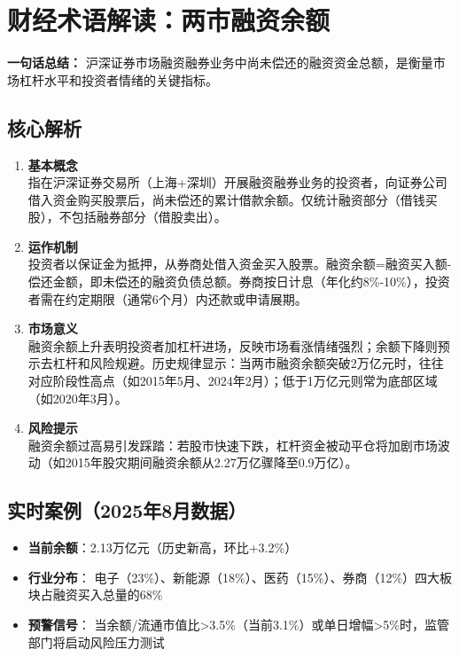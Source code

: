 \section{财经术语解读：两市融资余额}
\textbf{一句话总结：}  
沪深证券市场融资融券业务中尚未偿还的融资资金总额，是衡量市场杠杆水平和投资者情绪的关键指标。

\subsection{核心解析}
\begin{enumerate}[leftmargin=*, nosep]
    \item \textbf{基本概念}  \\
    指在沪深证券交易所（上海+深圳）开展融资融券业务的投资者，向证券公司借入资金购买股票后，尚未偿还的累计借款余额。仅统计融资部分（借钱买股），不包括融券部分（借股卖出）。
    
    \item \textbf{运作机制}  \\
    投资者以保证金为抵押，从券商处借入资金买入股票。{\color{red}融资余额=融资买入额-偿还金额，即未偿还的融资负债总额。}券商按日计息（年化约8\%-10\%），投资者需在约定期限（通常6个月）内还款或申请展期。
    
    \item \textbf{市场意义}  \\
    {\color{red}融资余额上升表明投资者加杠杆进场，反映市场看涨情绪强烈；余额下降则预示去杠杆和风险规避。}历史规律显示：{\color{blue}当两市融资余额突破2万亿元时，往往对应阶段性高点（如2015年5月、2024年2月）；低于1万亿元则常为底部区域（如2020年3月）。}
    
    \item \textbf{风险提示}  \\
    {\color{red}融资余额过高易引发踩踏：若股市快速下跌，杠杆资金被动平仓将加剧市场波动}（如2015年股灾期间融资余额从2.27万亿骤降至0.9万亿）。
\end{enumerate}

\subsection{实时案例（2025年8月数据）}
\begin{itemize}[leftmargin=*, nosep]
    \item \textbf{当前余额}：2.13万亿元（历史新高，环比+3.2\%）
    \item \textbf{行业分布}：  
    电子（23\%）、新能源（18\%）、医药（15\%）、券商（12\%）四大板块占融资买入总量的68\%
    \item \textbf{预警信号}：  
    当余额/流通市值比>3.5\%（当前3.1\%）或单日增幅>5\%时，监管部门将启动风险压力测试
\end{itemize}

